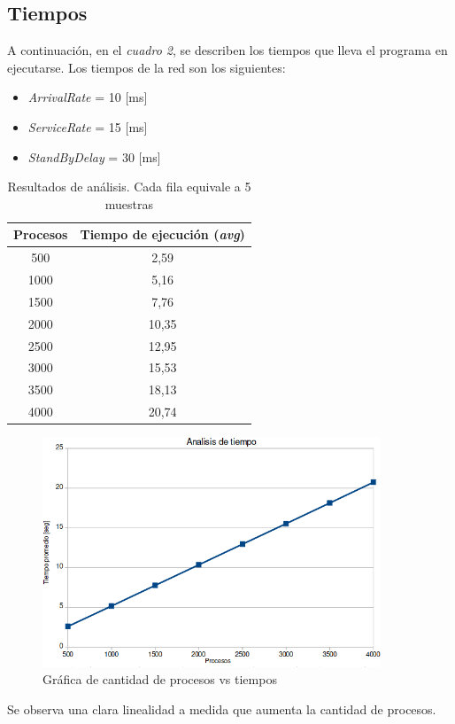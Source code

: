 \documentclass{article}
\begin{document}
    \subsection{Tiempos}
    A continuación, en el \emph{cuadro 2}, se describen los tiempos que lleva el programa en 
    ejecutarse. Los tiempos de la red son los siguientes: \par
    \begin{itemize}
        \item \emph{ArrivalRate} = 10 [ms]
        \item \emph{ServiceRate} = 15 [ms]
        \item \emph{StandByDelay} = 30 [ms]
    \end{itemize} 
    \begin{center}
        \begin{table}[H]
            \centering
            \begin{tabular}{||c|c||} 
                \hline
                Procesos & Tiempo de ejecución (\emph{avg}) \\ [0.5ex] 
                \hline\hline
                500 & 2,59 \\ 
                \hline
                1000 & 5,16 \\
                \hline
                1500 & 7,76 \\
                \hline
                2000 & 10,35 \\
                \hline
                2500 & 12,95 \\
                \hline
                3000 & 15,53 \\
                \hline
                3500 & 18,13 \\
                \hline
                4000 & 20,74 \\
                \hline
            \end{tabular}
            \caption{Resultados de análisis. Cada fila equivale a 5 muestras}
        \end{table}
    \end{center}
    \begin{figure}[H]
        \includegraphics[width=0.9\textwidth, center]{tiempos.png}
        \caption{Gráfica de cantidad de procesos vs tiempos}
    \end{figure}
    Se observa una clara linealidad a medida que aumenta la cantidad de procesos.
    \newpage 
\end{document}
